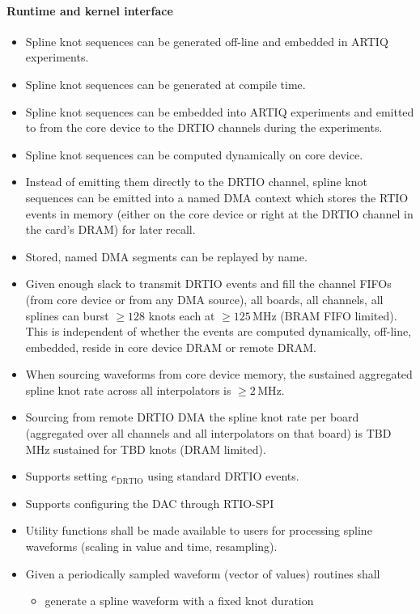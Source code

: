 \documentclass[11pt]{paper}
\begin{document}
\paragraph{Runtime and kernel interface}
\begin{itemize}
	\item Spline knot sequences can be generated off-line and embedded in ARTIQ experiments.
	\item Spline knot sequences can be generated at compile time.
	\item Spline knot sequences can be embedded into ARTIQ experiments and emitted to from the core device to the DRTIO channels during the experiments.
	\item Spline knot sequences can be computed dynamically on core device.
	\item Instead of emitting them directly to the DRTIO channel, spline knot sequences can be emitted into a named DMA context which stores the RTIO events in memory (either on the core device or right at the DRTIO channel in the card's DRAM) for later recall.
	\item Stored, named DMA segments can be replayed by name.
	\item Given enough slack to transmit DRTIO events and fill the channel FIFOs (from core device or from any DMA source), all boards, all channels, all splines can burst $\geq128$ knots each at $\geq125$\,MHz (BRAM FIFO limited). This is independent of whether the events are computed dynamically, off-line, embedded, reside in core device DRAM or remote DRAM.
	\item When sourcing waveforms from core device memory, the sustained aggregated spline knot rate across all interpolators is $\geq2$\,MHz.
	\item Sourcing from remote DRTIO DMA the spline knot rate per board (aggregated over all channels and all interpolators on that board) is TBD MHz sustained for TBD knots (DRAM limited).
	\item Supports setting $e_\mathrm{DRTIO}$ using standard DRTIO events.
	\item Supports configuring the DAC through RTIO-SPI
	\item Utility functions shall be made available to users for processing spline waveforms (scaling in value and time, resampling).
	\item Given a periodically sampled waveform (vector of values) routines shall
	\begin{itemize}
		\item generate a spline waveform with a fixed knot duration 

\end{itemize}
\end{itemize}
\end{document}
